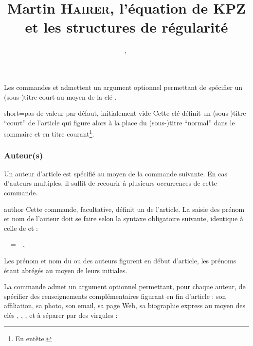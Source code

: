 Les commandes  et  admettent un argument
optionnel permettant de spécifier un (sous-)titre court au moyen de la clé
.

\begin{docKey}{short}{=}{pas de valeur par défaut,
    initialement vide}
  Cette clé définit un (sous-)titre \enquote{court} de l'article qui figure
  alors à la place du (sous-)titre \enquote{normal} dans le sommaire et en titre
  courant\footnote{En entête.}.
\end{docKey}

\begin{bodycode}
\title[short=Les travaux de Martin \textsc{Hairer}]{Martin \textsc{Hairer}, l'équation de KPZ et les structures de régularité}
\end{bodycode}

\subsubsection{Auteur(s)}
\label{sec:auteurs}

Un auteur d'article est spécifié au moyen de la commande 
suivante. En cas d'auteurs multiples, il  suffit de recourir à plusieurs
occurrences de cette commande.

\begin{docCommand}{author}{}
  Cette commande, facultative, définit un  de l'article. La saisie
  des prénom et nom de l'auteur doit se faire selon la syntaxe obligatoire
  suivante, identique à celle de  et  :
\begin{bodycode}[listing options={showspaces}]
~~=~~, ~~
\end{bodycode}
\end{docCommand}
%
Les prénom et nom du ou des auteurs figurent en début d'article, les prénoms
étant abrégés au moyen de leurs initiales.

La commande  admet un argument optionnel permettant, pour chaque
auteur, de spécifier des renseignements complémentaires figurant en fin
d'article : son affiliation, sa photo, son email, sa page Web, sa biographie
express au moyen des clés , , ,
 et  à séparer par des virgules :
\begin{bodycode}
\author[%
  affiliation=~\marg{affiliation(s)}~,%
  photo=~\meta{photo}~,%
  email=~\meta{email}~,%
  webpage=~\meta{page Web}~,%
  minibio=~\marg{biographie express}~%
]{~~, ~~}
\end{bodycode}

